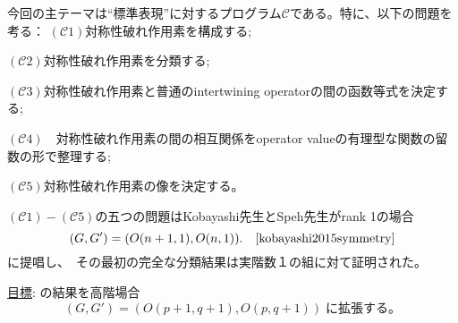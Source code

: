 \begin{frame}{}
	今回の主テーマは``標準表現''に対するプログラム$\mathcal{C}$である。特に、以下の問題を考る：
\vspace{-1em}{

}\qquad$(\mathcal{C}1)$\quad 対称性破れ作用素を構成する;{

	\vspace{-0.4em}
}\qquad$(\mathcal{C}2)$\quad 対称性破れ作用素を分類する;{

	\vspace{-0.4em}
}\qquad$(\mathcal{C}3)$\quad 対称性破れ作用素と普通のintertwining operatorの間の函数等式を決定する;{

	\vspace{-0.6em}
}\qquad$(\mathcal{C}4) \quad$対称性破れ作用素の間の相互関係をoperator valueの有理型な関数の留数の形で整理する;{

	\vspace{-0.6em}
}\qquad$(\mathcal{C}5)$\quad 対称性破れ作用素の像を決定する。{

}\vspace{-1em}\quad $(\mathcal{C}1) - (\mathcal{C}5)$の五つの問題はKobayashi先生とSpeh先生がrank 1の場合
\vspace{-0.6em}
\begin{equation*}
	(G, G') = (O (n + 1, 1), O (n, 1)). \quad\mbox{\cite{kobayashi2015symmetry}}
\vspace{-0.2em}
\end{equation*}
\mbox{に提唱し、\kern-0.1cm その最初の完全な分類結果は実階数１の組に対て証明された。}
\begin{block}{\underline{目標}:}
	\cite{kobayashi2015symmetry}の結果を高階場合
\vspace{-1em}
	\begin{equation*}
		(G, G') = (O (p + 1, q + 1), O (p, q + 1))\;\mbox{に拡張する。}
	\end{equation*}
\end{block}
\end{frame}
